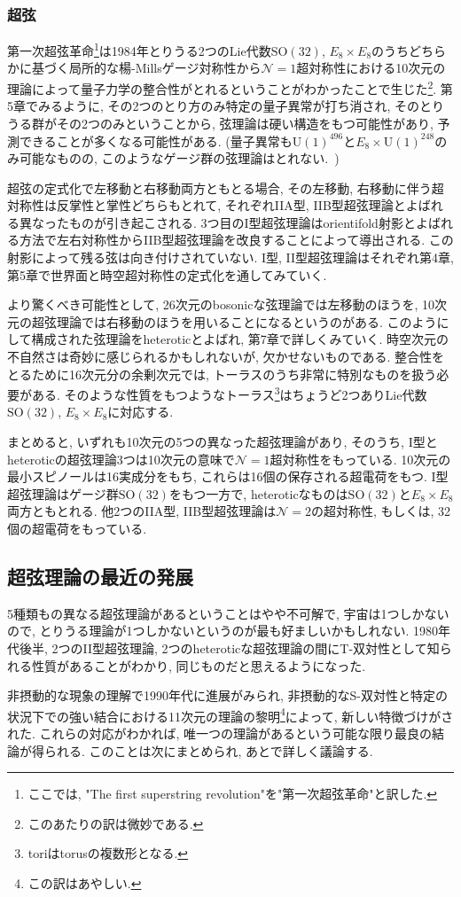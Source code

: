 \documentclass[10pt,a4paper]{jsarticle}
\begin{document}
\subsubsection*{超弦}
第一次超弦革命\footnote{ここでは, "The first superstring revolution"を"第一次超弦革命"と訳した. }は1984年とりうる2つのLie代数$\mathrm{SO} \left( 32 \right) $, $E_8 \times E_8 $のうちどちらかに基づく局所的な楊-Millsゲージ対称性から$\mathcal{N} = 1$超対称性における10次元の理論によって量子力学の整合性がとれるということがわかったことで生じた\footnote{このあたりの訳は微妙である. }. 第5章でみるように, その2つのとり方のみ特定の量子異常が打ち消され, そのとりうる群がその2つのみということから, 弦理論は硬い構造をもつ可能性があり, 予測できることが多くなる可能性がある. (量子異常も$\mathrm{U} \left( 1 \right)^{496} $と$E_8 \times \mathrm{U} \left( 1 \right)^{248} $のみ可能なものの, このようなゲージ群の弦理論はとれない.~)\par
超弦の定式化で左移動と右移動両方ともとる場合, その左移動, 右移動に伴う超対称性は反掌性と掌性どちらもとれて, それぞれIIA型, IIB型超弦理論とよばれる異なったものが引き起こされる. 3つ目のI型超弦理論はorientifold射影とよばれる方法で左右対称性からIIB型超弦理論を改良することによって導出される. この射影によって残る弦は向き付けされていない. I型, II型超弦理論はそれぞれ第4章, 第5章で世界面と時空超対称性の定式化を通してみていく. \par
より驚くべき可能性として, 26次元のbosonicな弦理論では左移動のほうを, 10次元の超弦理論では右移動のほうを用いることになるというのがある. このようにして構成された弦理論をheteroticとよばれ, 第7章で詳しくみていく. 時空次元の不自然さは奇妙に感じられるかもしれないが, 欠かせないものである. 整合性をとるために16次元分の余剰次元では, トーラスのうち非常に特別なものを扱う必要がある. そのような性質をもつようなトーラス\footnote{toriはtorusの複数形となる. }はちょうど2つありLie代数$\mathrm{SO} \left( 32 \right) $, $E_8 \times E_8 $に対応する. \par
まとめると, いずれも10次元の5つの異なった超弦理論があり, そのうち, I型とheteroticの超弦理論3つは10次元の意味で$\mathcal{N} = 1$超対称性をもっている. 10次元の最小スピノールは16実成分をもち, これらは16個の保存される超電荷をもつ. I型超弦理論はゲージ群$\mathrm{SO} \left( 32 \right) $をもつ一方で, heteroticなものは$\mathrm{SO} \left( 32 \right) $と$E_8 \times E_8 $両方ともとれる. 他2つのIIA型, IIB型超弦理論は$\mathcal{N} = 2$の超対称性, もしくは, 32個の超電荷をもっている. 
\subsection{超弦理論の最近の発展}
5種類もの異なる超弦理論があるということはやや不可解で, 宇宙は1つしかないので, とりうる理論が1つしかないというのが最も好ましいかもしれない. 1980年代後半, 2つのII型超弦理論, 2つのheteroticな超弦理論の間にT-双対性として知られる性質があることがわかり, 同じものだと思えるようになった. \par
非摂動的な現象の理解で1990年代に進展がみられ, 非摂動的なS-双対性と特定の状況下での強い結合における11次元の理論の黎明\footnote{この訳はあやしい. }によって, 新しい特徴づけがされた. これらの対応がわかれば, 唯一つの理論があるという可能な限り最良の結論が得られる. このことは次にまとめられ, あとで詳しく議論する. 
\end{document}
